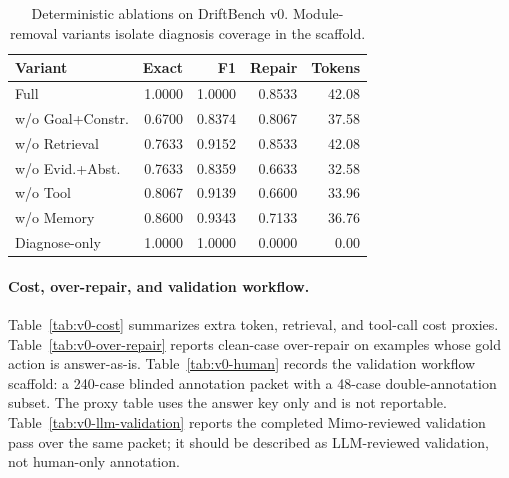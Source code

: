 \documentclass[letterpaper]{article}
\begin{document}
\begin{table}[t]
\centering
\scriptsize
\setlength{\tabcolsep}{3pt}
\begin{tabular}{lrrrr}
\toprule
Variant & Exact & F1 & Repair & Tokens \\
\midrule
Full & 1.0000 & 1.0000 & 0.8533 & 42.08 \\
w/o Goal+Constr. & 0.6700 & 0.8374 & 0.8067 & 37.58 \\
w/o Retrieval & 0.7633 & 0.9152 & 0.8533 & 42.08 \\
w/o Evid.+Abst. & 0.7633 & 0.8359 & 0.6633 & 32.58 \\
w/o Tool & 0.8067 & 0.9139 & 0.6600 & 33.96 \\
w/o Memory & 0.8600 & 0.9343 & 0.7133 & 36.76 \\
Diagnose-only & 1.0000 & 1.0000 & 0.0000 & 0.00 \\
\bottomrule
\end{tabular}
\caption{Deterministic ablations on DriftBench v0. Module-removal variants isolate diagnosis coverage in the scaffold.}
\label{tab:v0-ablation}
\end{table}

\paragraph{Cost, over-repair, and validation workflow.}
Table~\ref{tab:v0-cost} summarizes extra token, retrieval, and tool-call cost proxies. Table~\ref{tab:v0-over-repair} reports clean-case over-repair on examples whose gold action is answer-as-is. Table~\ref{tab:v0-human} records the validation workflow scaffold: a 240-case blinded annotation packet with a 48-case double-annotation subset. The proxy table uses the answer key only and is not reportable. Table~\ref{tab:v0-llm-validation} reports the completed Mimo-reviewed validation pass over the same packet; it should be described as LLM-reviewed validation, not human-only annotation.
\end{document}
